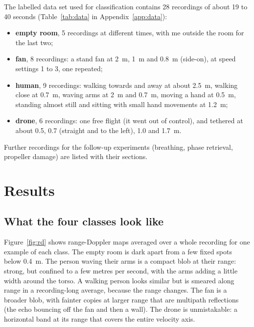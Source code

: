 \documentclass[11pt,a4paper]{article}
\begin{document}
The labelled data set used for classification contains 28 recordings of about 19 to 40 seconds (Table~\ref{tab:data} in Appendix~\ref{app:data}):
\begin{itemize}
\item \textbf{empty room}, 5 recordings at different times, with me outside the room for the last two;
\item \textbf{fan}, 8 recordings: a stand fan at \SI{2}{m}, \SI{1}{m} and \SI{0.8}{m} (side-on), at speed settings 1 to 3, one repeated;
\item \textbf{human}, 9 recordings: walking towards and away at about \SI{2.5}{m}, walking close at \SI{0.7}{m}, waving arms at \SI{2}{m} and \SI{0.7}{m}, moving a hand at \SI{0.5}{m}, standing almost still and sitting with small hand movements at \SI{1.2}{m};
\item \textbf{drone}, 6 recordings: one free flight (it went out of control), and tethered at about 0.5, 0.7 (straight and to the left), 1.0 and \SI{1.7}{m}.
\end{itemize}
Further recordings for the follow-up experiments (breathing, phase retrieval, propeller damage) are listed with their sections.

\section{Results}\label{sec:results}

\subsection{What the four classes look like}

Figure~\ref{fig:rd} shows range-Doppler maps averaged over a whole recording for one example of each class. The empty room is dark apart from a few fixed spots below \SI{0.4}{m}. The person waving their arms is a compact blob at their range: strong, but confined to a few metres per second, with the arms adding a little width around the torso. A walking person looks similar but is smeared along range in a recording-long average, because the range changes. The fan is a broader blob, with fainter copies at larger range that are multipath reflections (the echo bouncing off the fan and then a wall). The drone is unmistakable: a horizontal band at its range that covers the entire velocity axis.
\end{document}
